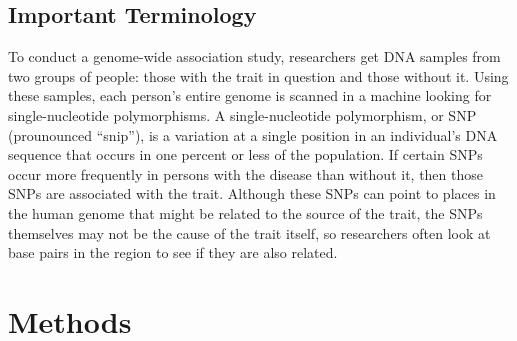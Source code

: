 \documentclass{article}
\begin{document}
\subsection*{Important Terminology}
To conduct a genome-wide association study, researchers get DNA samples from two
groups of people: those with the trait in question and those without it. Using 
these samples, each person's entire genome is scanned in a machine looking for 
single-nucleotide polymorphisms. A single-nucleotide polymorphism, or SNP 
(prounounced ``snip''), is a variation at a single position in an individual's 
DNA sequence that occurs in one percent or less of the population. If certain 
SNPs occur more frequently in persons with the disease than without it, then 
those SNPs are associated with the trait. Although these SNPs can point to places 
in the human genome that might be related to the source of the trait, the SNPs 
themselves may not be the cause of the trait itself, so researchers often look 
at base pairs in the region to see if they are also related\cite{NatureEducat}.

\section*{Methods}
\end{document}
